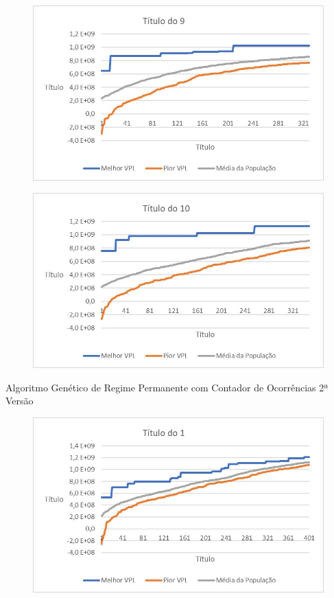 \documentclass[12pt,a4paper]{report}
\begin{document}
\begin{figure}[H]
\centering

\includegraphics[scale=1]{AGRPCO1/9}

\end{figure}
\begin{figure}[H]
\centering

\includegraphics[scale=1]{AGRPCO1/10}

\end{figure}

Algoritmo Genético de Regime Permanente com Contador de Ocorrências 2ª Versão

\begin{figure}[H]
\centering

\includegraphics[scale=1]{AGRPCO2/1}

\end{figure}
\end{document}
